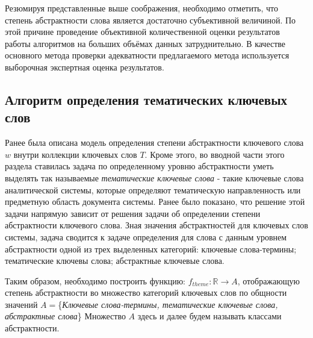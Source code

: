 Резюмируя представленные выше соображения, необходимо отметить, что степень абстрактности слова является достаточно субъективной величиной. По этой причине проведение объективной количественной оценки результатов работы алгоритмов на больших объёмах данных затруднительно. В качестве основного метода проверки адекватности предлагаемого метода используется выборочная экспертная оценка результатов.

\subsection{Алгоритм определения тематических ключевых слов} \label{theme_keywords}


Ранее была описана модель определения степени абстрактности ключевого слова $w$ внутри коллекции ключевых слов $T$. Кроме этого, во вводной части этого раздела ставилась задача по определенному уровню абстрактности уметь выделять так называемые \emph{тематические ключевые слова} - такие ключевые слова аналитической системы, которые определяют тематическую направленность или предметную область документа системы. Ранее было показано, что решение этой задачи напрямую зависит от решения задачи об определении степени абстрактности ключевого слова. Зная значения абстрактностей для ключевых слов системы, задача сводится к задаче определения для слова с данным уровнем абстрактности одной из трех выделенных категорий: ключевые слова-термины; тематические ключевы слова; абстрактные ключевые слова.

Таким образом, необходимо построить функцию: $f_{theme} : \mathbb{R} \rightarrow A$, отображающую степень абстрактности во множество категорий ключевых слов по общности значений $A = $\{\emph{Ключевые слова-термины, тематические ключевые слова, абстрактные слова}\} Множество $A$ здесь и далее будем называть классами абстрактности.



